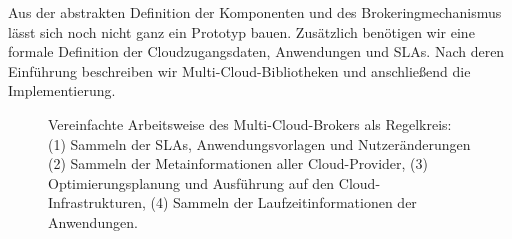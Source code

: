 \vspace{0.5cm}

\noindent
Aus der abstrakten Definition der Komponenten und des Brokeringmechanismus lässt sich noch nicht ganz ein Prototyp bauen. Zusätzlich benötigen wir eine formale Definition der Cloudzugangsdaten, Anwendungen und SLAs. Nach deren Einführung beschreiben wir Multi-Cloud-Bibliotheken und anschließend die Implementierung.

\begin{figure}
	\centering	
	\def\svgwidth{\textwidth}
	{\footnotesize \textsf{
			}}
	\caption{Vereinfachte Arbeitsweise des Multi-Cloud-Brokers als Regelkreis: (1) Sammeln der SLAs, Anwendungsvorlagen und Nutzeränderungen (2) Sammeln der Metainformationen aller Cloud-Provider, (3) Optimierungsplanung und Ausführung auf den Cloud-Infrastrukturen, (4) Sammeln der Laufzeitinformationen der Anwendungen.}
	\label{fig:cycle}
\end{figure}

